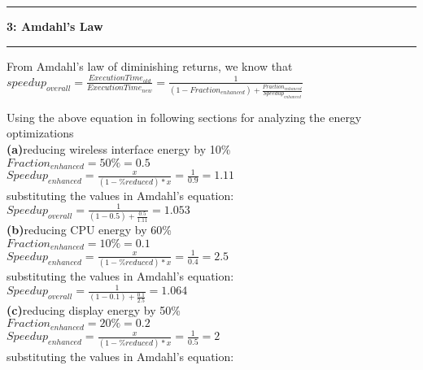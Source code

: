 \documentclass[11pt]{article}
\newcommand\question[2]{\vspace{.25in}\hrule\textbf{#1: #2}\vspace{.5em}\hrule\vspace{.10in}}
\renewcommand\part[1]{\vspace{.10in}\textbf{(#1)}}
\begin{document}
\question{3}{Amdahl's Law}

From Amdahl's law of diminishing returns, we know that \\

$speedup_{overall} = \frac{ExecutionTime_{old}}{ExecutionTime_{new}}=\frac{1}{(1-Fraction_{enhanced})+\frac{Fraction_{enhanced}}{Speedup_{enhanced}}}$

Using the above equation in following sections for analyzing the energy optimizations\\
\part{a}{reducing wireless interface energy by 10\%}\\
$Fraction_{enhanced} = 50\% = 0.5$\\
$Speedup_{enhanced} = \frac{x}{(1-\% reduced)*x} = \frac{1}{0.9}=1.11$\\

substituting the values in Amdahl's equation:\\

$Speedup_{overall}=\frac{1}{(1-0.5)+\frac{0.5}{1.11}}=1.053$\\

\part{b}{reducing CPU energy by 60\%}\\
$Fraction_{enhanced} = 10\% = 0.1$\\
$Speedup_{enhanced} = \frac{x}{(1-\% reduced)*x} = \frac{1}{0.4}=2.5$\\

substituting the values in Amdahl's equation:\\

$Speedup_{overall}=\frac{1}{(1-0.1)+\frac{0.1}{2.5}}=1.064$\\

\part{c}{reducing display energy by 50\%}\\
$Fraction_{enhanced} = 20\% = 0.2$\\
$Speedup_{enhanced} = \frac{x}{(1-\% reduced)*x} = \frac{1}{0.5}=2$\\

substituting the values in Amdahl's equation:\\
\end{document}
